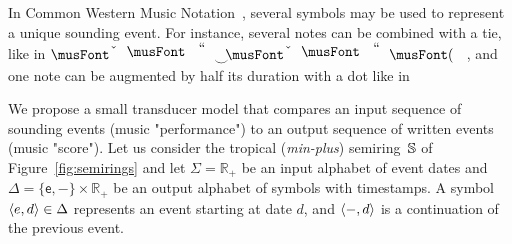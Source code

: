 \begin{example}
In Common Western Music Notation~\cite{Gould11Notation}, 
several symbols may be used to represent a unique sounding event.
For instance, several notes can be combined with a tie, 
like in $\musQuarter\!\!\!\mathrel{\raisebox{-1.5mm}{$\smile$}}\!\!\!\musEighth$,  
and one note can be augmented by half its duration with a dot like in~\musQuarterDotted{}

\noindent 
We propose a small transducer model that compares an input sequence of sounding 
events (music "performance") 
to an output sequence of written events (music "score").
%
Let us consider the tropical (\emph{min-plus}) semiring~$\mathbb{S}$ 
of Figure~\ref{fig:semirings} and 
let $\Sigma = \mathbb{R}_+$ be an input alphabet of event dates
and $\Delta = \{ \mathsf{e}, \mathsf{-} \} \times \mathbb{R}_+$ 
be an output alphabet of symbols with timestamps. 
A symbol $\< \mathsf{e}, d > \in \Delta$ represents an event starting at date $d$, 
and $\< \mathsf{-}, d >$ is a continuation of the previous event.


\end{example}
